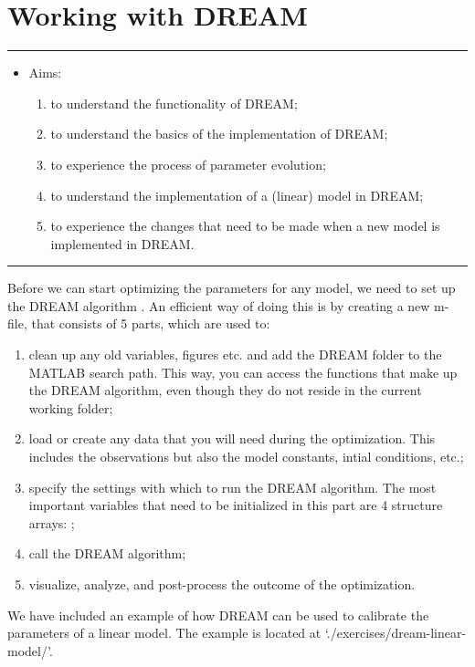 \chapter{Working with DREAM}
\thispagestyle{fancy}
\label{ch:Working-with-DREAM}


\hrule
\begin{itemize}
\footnotesize
\item[]{Aims:}
\begin{enumerate}
\item{to understand the functionality of DREAM;}
\item{to understand the basics of the implementation of DREAM;}
\item{to experience the process of parameter evolution;}
\item{to understand the implementation of a (linear) model in DREAM;}
\item{to experience the changes that need to be made when a new model is implemented in DREAM.}
\end{enumerate}
\end{itemize}
\hrule
\vspace{1em}

Before we can start optimizing the parameters for any model, we need to set up the DREAM algorithm \citep{vrug-terb-diks-robi-hyma-higd2009}. An efficient way of doing this is by creating a new m-file, that consists of 5 parts, which are used to:
\begin{enumerate}
\item{clean up any old variables, figures etc. and add the DREAM folder to the MATLAB search path. This way, you can access the functions that make up the DREAM algorithm, even though they do not reside in the current working folder;}
\item{load or create any data that you will need during the optimization. This includes the observations but also the model constants, intial conditions, etc.;}
\item{specify the settings with which to run the DREAM algorithm. The most important variables that need to be initialized in this part are 4 structure arrays: ;}
\item{call the DREAM algorithm;}
\item{visualize, analyze, and post-process the outcome of the optimization.}
\end{enumerate}


We have included an example of how DREAM can be used to calibrate the parameters of a linear model. The example is located at `./exercises/dream-linear-model/'. 

